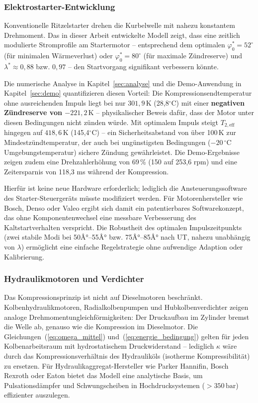 ﻿\documentclass[a4paper,12pt]{article}
\begin{document}
\subsubsection{Elektrostarter-Entwicklung}

Konventionelle Ritzelstarter drehen die Kurbelwelle mit nahezu
konstantem Drehmoment. Das in dieser Arbeit entwickelte Modell zeigt,
dass eine zeitlich modulierte Stromprofile am Startermotor -- entsprechend
dem optimalen $\varphi_0^* = 52^\circ$ (für minimalen Wärmeverlust) oder
$\varphi_0^* = 80^\circ$ (für maximale Zündreserve) und
$\lambda^* \approx 0{,}88$ bzw. $0{,}97$ -- den Startvorgang signifikant
verbessern könnte.

Die numerische Analyse in Kapitel~\ref{sec:analyse} und die Demo-Anwendung
in Kapitel~\ref{sec:demo} quantifizieren diesen Vorteil: Die
Kompressionsendtemperatur ohne ausreichenden Impuls liegt bei nur
$301{,}9\,\text{K}$ (28{,}8$^\circ$C) mit einer \textbf{negativen Zündreserve
von $-221{,}2\,\text{K}$} -- physikalischer Beweis dafür, dass der Motor unter
diesen Bedingungen nicht zünden würde. Mit optimalem Impuls steigt
$T_{2,\text{eff}}$ hingegen auf $418{,}6\,\text{K}$ (145{,}4$^\circ$C)
-- ein Sicherheitsabstand von über 100\,K zur Mindestzündtemperatur, der
auch bei ungünstigsten Bedingungen ($-20\,^\circ\text{C}$ Umgebungstemperatur)
sichere Zündung gewährleistet. Die Demo-Ergebnisse zeigen zudem eine
Drehzahlerhöhung von 69\,\% (150 auf 253{,}6 rpm) und eine
Zeitersparnis von 118{,}3 ms während der Kompression.

Hierfür ist keine neue Hardware erforderlich; lediglich die Ansteuerungssoftware
des Starter-Steuergeräts müsste modifiziert werden. Für Motorenhersteller wie
Bosch, Denso oder Valeo ergibt sich damit ein patentierbares Softwarekonzept,
das ohne Komponentenwechsel eine messbare Verbesserung des Kaltstartverhalten
verspricht. Die Robustheit des optimalen Impulszeitpunkts (zwei stabile Modi
bei 50Â°--55Â° bzw. 75Â°--85Â° nach UT, nahezu unabhängig von $\lambda$) ermöglicht
eine einfache Regelstrategie ohne aufwendige Adaption oder Kalibrierung.

\subsubsection{Hydraulikmotoren und Verdichter}

Das Kompressionsprinzip ist nicht auf Dieselmotoren beschränkt.
Kolbenhydraulikmotoren, Radialkolbenpumpen und Hubkolbenverdichter
zeigen analoge Drehmomentungleichförmigkeiten: Der Druckaufbau im
Zylinder bremst die Welle ab, genauso wie die Kompression im Dieselmotor.
Die Gleichungen~(\ref{eq:omega_mittel}) und~(\ref{eq:energie_bedingung})
gelten für jeden Kolbenarbeitsraum mit hydrostatischem Druckwiderstand --
lediglich $\kappa$ wäre durch das Kompressionsverhältnis des Hydrauliköls
(isotherme Kompressibilität) zu ersetzen. Für Hydraulikaggregat-Hersteller
wie Parker Hannifin, Bosch Rexroth oder Eaton bietet das Modell eine
analytische Basis, um Pulsationsdämpfer und Schwungscheiben in
Hochdrucksystemen ($>350\,\text{bar}$) effizienter auszulegen.
\end{document}

